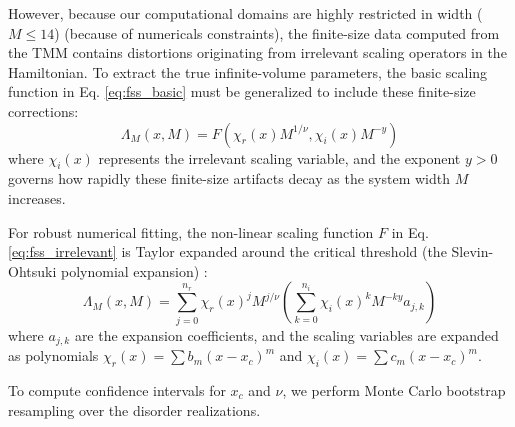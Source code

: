 However, because our computational domains are highly restricted in width ($M \leq 14$) (because of numericals constraints), the finite-size data computed from the TMM contains distortions originating from irrelevant scaling operators in the Hamiltonian. To extract the true infinite-volume parameters, the basic scaling function in Eq. \ref{eq:fss_basic} must be generalized to include these finite-size corrections:
\begin{equation}
\Lambda_M(x, M) = F\left( \chi_r(x) M^{1/\nu}, \chi_i(x) M^{-y} \right) \label{eq:fss_irrelevant}
\end{equation}
where $\chi_i(x)$ represents the irrelevant scaling variable, and the exponent $y > 0$ governs how rapidly these finite-size artifacts decay as the system width $M$ increases.

For robust numerical fitting, the non-linear scaling function $F$ in Eq. \ref{eq:fss_irrelevant} is Taylor expanded around the critical threshold (the Slevin-Ohtsuki polynomial expansion) \cite{Slevin2014}:
\begin{equation}
\Lambda_M(x, M) = \sum_{j=0}^{n_r} \chi_r(x)^j M^{j/\nu} \left( \sum_{k=0}^{n_i} \chi_i(x)^k M^{-k y} a_{j,k} \right) \label{eq:fss_polynomial}
\end{equation}
where $a_{j,k}$ are the expansion coefficients, and the scaling variables are expanded as polynomials $\chi_r(x) = \sum b_m (x - x_c)^m$ and $\chi_i(x) = \sum c_m (x - x_c)^m$.

To compute confidence intervals for $x_c$ and $\nu$, we perform Monte Carlo bootstrap resampling over the disorder realizations.
